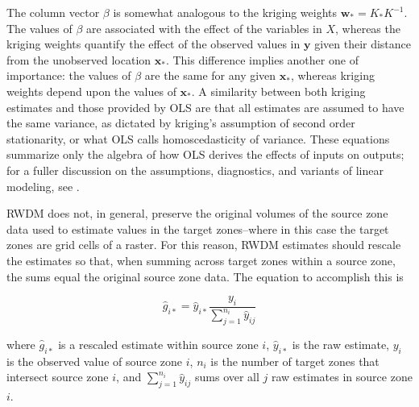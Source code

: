 \documentclass[draft]{article}
\begin{document}
The column vector $\beta$ is somewhat analogous to the kriging weights $\bm{w}_*=K_*K^{-1}$.  The values of $\beta$ are associated with the effect of the variables in $X$, whereas the kriging weights quantify the effect of the observed values in $\bm{y}$ given their distance from the unobserved location $\bm{x}_*$.  This difference implies another one of importance: the values of $\beta$ are the same for any given $\bm{x}_*$, whereas kriging weights depend upon the values of $\bm{x}_*$.  A similarity between both kriging estimates and those provided by OLS are that all estimates are assumed to have the same variance, as dictated by kriging's assumption of second order stationarity, or what OLS calls homoscedasticity of variance.  These equations summarize only the algebra of how OLS derives the effects of inputs on outputs; for a fuller discussion on the assumptions, diagnostics, and variants of linear modeling, see \cite{nelder72, mardia80, gelman06}.

RWDM does not, in general, preserve the original volumes of the source zone data used to estimate values in the target zones--where in this case the target zones are grid cells of a raster.  For this reason, RWDM estimates should rescale the estimates so that, when summing across target zones within a source zone, the sums equal the original source zone data.  The equation to accomplish this is

\[\hat{g}_{i*} = \hat{y}_{i*} \frac{y_i}{\sum_{j=1}^{n_i} \hat{y}_{ij}}\]

where $\hat{g}_{i*}$ is a rescaled estimate within source zone $i$, $\hat{y}_{i*}$ is the raw estimate, $y_i$ is the observed value of source zone $i$, $n_i$ is the number of target zones that intersect source zone $i$, and $\sum_{j=1}^{n_i} \hat{y}_{ij}$ sums over all $j$ raw estimates in source zone $i$.




\end{document}

